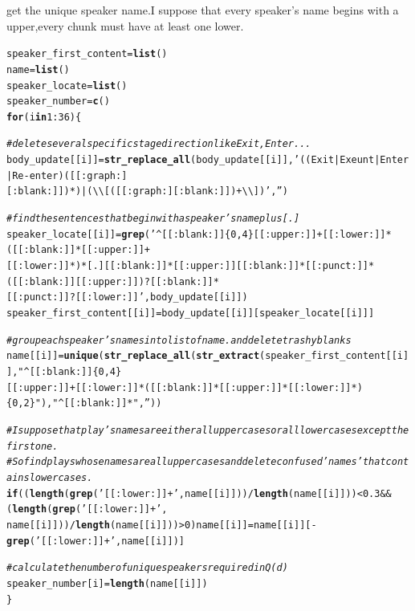 \documentclass{article}\usepackage[]{graphicx}\usepackage[]{color}
\makeatletter
\newcommand{\hlnum}[1]{\textcolor[rgb]{0.686,0.059,0.569}{#1}}%
\newcommand{\hlstr}[1]{\textcolor[rgb]{0.192,0.494,0.8}{#1}}%
\newcommand{\hlcom}[1]{\textcolor[rgb]{0.678,0.584,0.686}{\textit{#1}}}%
\newcommand{\hlopt}[1]{\textcolor[rgb]{0,0,0}{#1}}%
\newcommand{\hlstd}[1]{\textcolor[rgb]{0.345,0.345,0.345}{#1}}%
\newcommand{\hlkwa}[1]{\textcolor[rgb]{0.161,0.373,0.58}{\textbf{#1}}}%
\newcommand{\hlkwb}[1]{\textcolor[rgb]{0.69,0.353,0.396}{#1}}%
\newcommand{\hlkwd}[1]{\textcolor[rgb]{0.737,0.353,0.396}{\textbf{#1}}}%
\newenvironment{kframe}{%
 \def\at@end@of@kframe{}%
 \ifinner\ifhmode%
  \def\at@end@of@kframe{\end{minipage}}%
  \begin{minipage}{\columnwidth}%
 \fi\fi%
 \def\FrameCommand##1{\hskip\@totalleftmargin \hskip-\fboxsep
 \colorbox{shadecolor}{##1}\hskip-\fboxsep
     \hskip-\linewidth \hskip-\@totalleftmargin \hskip\columnwidth}%
 \MakeFramed {\advance\hsize-\width
   \@totalleftmargin\z@ \linewidth\hsize
   \@setminipage}}%
 {\par\unskip\endMakeFramed%
 \at@end@of@kframe}
\newenvironment{knitrout}{}{} %
\makeatother
\begin{document}
get the unique speaker name.I suppose that every speaker's name begins with a upper,every chunk must have at least one lower.
\begin{knitrout}
\color{fgcolor}\begin{kframe}
\begin{alltt}
\hlstd{speaker_first_content}\hlkwb{=}\hlkwd{list}\hlstd{()}
\hlstd{name}\hlkwb{=}\hlkwd{list}\hlstd{()}
\hlstd{speaker_locate}\hlkwb{=}\hlkwd{list}\hlstd{()}
\hlstd{speaker_number}\hlkwb{=}\hlkwd{c}\hlstd{()}
\hlkwa{for}\hlstd{(i} \hlkwa{in} \hlnum{1}\hlopt{:}\hlnum{36}\hlstd{)\{}

\hlcom{#delete several specific stage direction like Exit,Enter...}
  \hlstd{body_update[[i]]}\hlkwb{=}\hlkwd{str_replace_all}\hlstd{(body_update[[i]],}\hlstr{'((Exit|Exeunt|Enter|Re-enter)([[:graph:]
[:blank:]])*)|(\textbackslash{}\textbackslash{}[([[:graph:][:blank:]])+\textbackslash{}\textbackslash{}])'}\hlstd{,}\hlstr{''}\hlstd{)}

\hlcom{#find the sentences that begin with a speaker's name plus [.]}
  \hlstd{speaker_locate[[i]]}\hlkwb{=}\hlkwd{grep}\hlstd{(}\hlstr{'^[[:blank:]]\{0,4\}[[:upper:]]+[[:lower:]]*([[:blank:]]*[[:upper:]]+
[[:lower:]]*)*[.][[:blank:]]*[[:upper:]][[:blank:]]*[[:punct:]]*([[:blank:]][[:upper:]])?[[:blank:]]*
[[:punct:]]?[[:lower:]]'}\hlstd{,body_update[[i]])}
  \hlstd{speaker_first_content[[i]]}\hlkwb{=}\hlstd{body_update[[i]][speaker_locate[[i]]]}

\hlcom{#group each speaker's names in to list of name.and delete trashy blanks}
  \hlstd{name[[i]]}\hlkwb{=}\hlkwd{unique}\hlstd{(}\hlkwd{str_replace_all}\hlstd{(}\hlkwd{str_extract}\hlstd{(speaker_first_content[[i]],}\hlstr{"^[[:blank:]]\{0,4\}
[[:upper:]]+[[:lower:]]*([[:blank:]]*[[:upper:]]*[[:lower:]]*)\{0,2\}"}\hlstd{),}\hlstr{"^[[:blank:]]*"}\hlstd{,}\hlstr{''}\hlstd{))}

\hlcom{#I suppose that  play's names are either all upper cases or all lower cases except the first one. }
\hlcom{#So find plays whose names are all upper cases and delete confused 'names' that contains lower cases. }
  \hlkwa{if}\hlstd{((}\hlkwd{length}\hlstd{(}\hlkwd{grep}\hlstd{(}\hlstr{'[[:lower:]]+'}\hlstd{,name[[i]]))}\hlopt{/}\hlkwd{length}\hlstd{(name[[i]]))}\hlopt{<}\hlnum{0.3}\hlopt{&&}\hlstd{(}\hlkwd{length}\hlstd{(}\hlkwd{grep}\hlstd{(}\hlstr{'[[:lower:]]+'}\hlstd{,}
\hlstd{name[[i]]))}\hlopt{/}\hlkwd{length}\hlstd{(name[[i]]))}\hlopt{>}\hlnum{0}\hlstd{)             name[[i]]}\hlkwb{=}\hlstd{name[[i]][}\hlopt{-}\hlkwd{grep}\hlstd{(}\hlstr{'[[:lower:]]+'}\hlstd{,name[[i]])]}

\hlcom{#calculate the number of unique speakers required in Q(d)}
  \hlstd{speaker_number[i]}\hlkwb{=}\hlkwd{length}\hlstd{(name[[i]])}
\hlstd{\}}
\end{alltt}
\end{kframe}
\end{knitrout}
\end{document}
